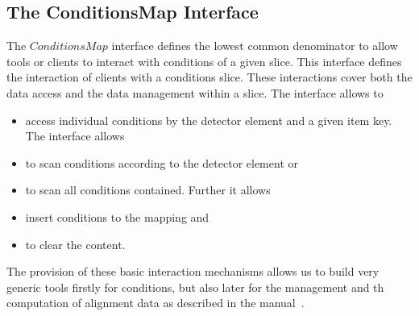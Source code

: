\documentclass[10pt,a4paper]{article}
\begin{document}
\subsection{The ConditionsMap Interface}
\label{subsec:ddcond-conditionsmap}

\noindent
The $ConditionsMap$ interface defines the lowest common denominator to
allow tools or clients to interact with conditions of a given slice.
This interface defines the interaction of clients with a conditions slice.
These interactions cover both the data access and the data management 
within a slice. The interface allows to
\begin{itemize}\itemcompact
\item access individual conditions by the detector element
and a given item key. The interface allows
\item to scan conditions according to the detector element or 
\item to scan all conditions contained. Further it allows 
\item insert conditions to the mapping and
\item to clear the content.
\end{itemize}
The provision of these basic interaction mechanisms allows us to build
very generic tools firstly for conditions, but also later for the
management and th computation of alignment data as described in
the \DDA manual~\cite{bib:ddalign-manual}.
\end{document}
